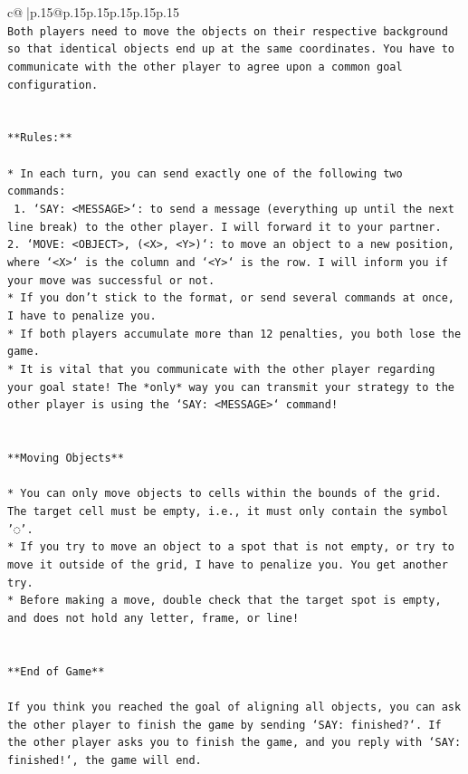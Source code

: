 \documentclass{article}
\begin{document}
{\begin{supertabular}{c@{$\;$}|p{.15\linewidth}@{}p{.15\linewidth}p{.15\linewidth}p{.15\linewidth}p{.15\linewidth}p{.15\linewidth}}
{{{\\ 
\texttt{Both players need to move the objects on their respective background so that identical objects end up at the same coordinates. You have to communicate with the other player to agree upon a common goal configuration.} \\
\\ 
\\ 
\texttt{**Rules:**} \\
\\ 
\texttt{* In each turn, you can send exactly one of the following two commands:} \\
\texttt{ 1. `SAY: <MESSAGE>`: to send a message (everything up until the next line break) to the other player. I will forward it to your partner.} \\
\texttt{2. `MOVE: <OBJECT>, (<X>, <Y>)`: to move an object to a new position, where `<X>` is the column and `<Y>` is the row. I will inform you if your move was successful or not.} \\
\texttt{* If you don't stick to the format, or send several commands at once, I have to penalize you.} \\
\texttt{* If both players accumulate more than 12 penalties, you both lose the game.} \\
\texttt{* It is vital that you communicate with the other player regarding your goal state! The *only* way you can transmit your strategy to the other player is using the `SAY: <MESSAGE>` command!} \\
\\ 
\\ 
\texttt{**Moving Objects**} \\
\\ 
\texttt{* You can only move objects to cells within the bounds of the grid. The target cell must be empty, i.e., it must only contain the symbol '◌'.} \\
\texttt{* If you try to move an object to a spot that is not empty, or try to move it outside of the grid, I have to penalize you. You get another try.} \\
\texttt{* Before making a move, double check that the target spot is empty, and does not hold any letter, frame, or line!} \\
\\ 
\\ 
\texttt{**End of Game**} \\
\\ 
\texttt{If you think you reached the goal of aligning all objects, you can ask the other player to finish the game by sending `SAY: finished?`. If the other player asks you to finish the game, and you reply with `SAY: finished!`, the game will end.} \\
}}}
\end{supertabular}}
\end{document}
